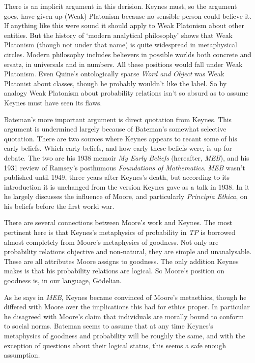 \documentclass[noflushend]{philosophersimprint}
\begin{document}
There is an implicit argument in this derision. Keynes must, so the
argument goes, have given up (Weak) Platonism because no sensible person
could believe it. If anything like this were sound it should apply to
Weak Platonism about other entities. But the history of `modern
analytical philosophy' shows that Weak Platonism (though not under that
name) is quite widespread in metaphysical circles. Modern philosophy
includes believers in possible worlds both concrete and ersatz, in
universals and in numbers. All these positions would fall under Weak
Platonism. Even Quine's ontologically sparse \emph{Word and Object} was
Weak Platonist about classes, though he probably wouldn't like the
label. So by analogy Weak Platonism about probability relations isn't so
absurd as to assume Keynes must have seen its flaws.

Bateman's more important argument is direct quotation from Keynes. This
argument is undermined largely because of Bateman's somewhat selective
quotation. There are two sources where Keynes appears to recant some of
his early beliefs. Which early beliefs, and how early these beliefs
were, is up for debate. The two are his 1938 memoir \emph{My Early
Beliefs} (hereafter, \emph{MEB}), and his 1931 review of Ramsey's
posthumous \emph{Foundations of Mathematics}. \emph{MEB} wasn't
published until 1949, three years after Keynes's death, but according to
its introduction it is unchanged from the version Keynes gave as a talk
in 1938. In it he largely discusses the influence of Moore, and
particularly \emph{Principia Ethica}, on his beliefs before the first
world war.

There are several connections between Moore's work and Keynes. The most
pertinent here is that Keynes's metaphysics of probability in \emph{TP}
is borrowed almost completely from Moore's metaphysics of goodness. Not
only are probability relations objective and non-natural, they are
simple and unanalysable. These are all attributes Moore assigns to
goodness. The only addition Keynes makes is that his probability
relations are logical. So Moore's position on goodness is, in our
language, Gödelian.

As he says in \emph{MEB}, Keynes became convinced of Moore's metaethics,
though he differed with Moore over the implications this had for ethics
proper. In particular he disagreed with Moore's claim that individuals
are morally bound to conform to social norms. Bateman seems to assume
that at any time Keynes's metaphysics of goodness and probability will
be roughly the same, and with the exception of questions about their
logical status, this seems a safe enough assumption.
\end{document}

